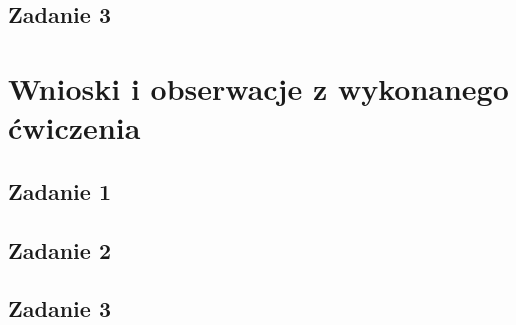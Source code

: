 \documentclass[a4paper, 12pt]{article}
\begin{document}
        \subsection{Zadanie 3}
    \section{Wnioski i obserwacje z wykonanego ćwiczenia}
        \subsection{Zadanie 1}
        \subsection{Zadanie 2}
        \subsection{Zadanie 3}
\end{document}
